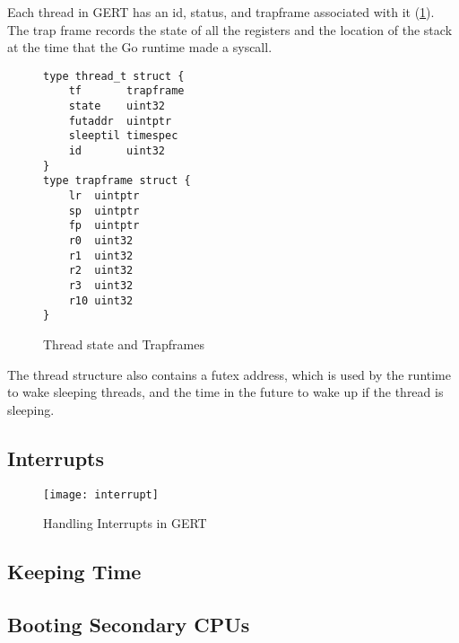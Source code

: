 Each thread in GERT has an id, status, and trapframe associated with it (\ref{fig:threadtrap}).
The trap frame records the state of all the registers and the location of the stack at
the time that the Go runtime made a syscall.

\begin{figure}[h]
  \begin{lstlisting}
type thread_t struct {
	tf       trapframe
	state    uint32
	futaddr  uintptr
	sleeptil timespec
	id       uint32
}
type trapframe struct {
	lr  uintptr
	sp  uintptr
	fp  uintptr
	r0  uint32
	r1  uint32
	r2  uint32
	r3  uint32
	r10 uint32
}
\end{lstlisting}

  \caption{Thread state and Trapframes} \label{fig:threadtrap}
\end{figure}

The thread structure also contains a futex address, which is used by the runtime to wake
sleeping threads, and the time in the future to wake up if the thread is sleeping.




\subsection{Interrupts}
\begin{figure}[h]
\begin{center}
  \texttt{[image: interrupt]}
\end{center}
  \caption{Handling Interrupts in GERT} \label{fig:interrupt}
\end{figure}



\subsection{Keeping Time}
\subsection{Booting Secondary CPUs}

